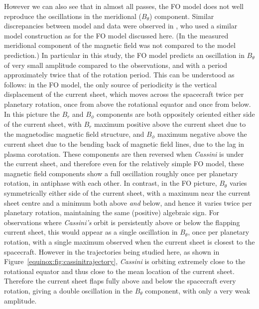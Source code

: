 However we can also see that in almost all passes, the FO model does not well reproduce the oscillations in the meridional ($B_{\theta}$) component. Similar discrepancies between model and data were observed in \citet{achilleos2014}, who used a similar model construction as for the FO model discussed here. (In \citet{arridge2011} the measured meridional component of the magnetic field was not compared to the model prediction.) In particular in this study, the FO model predicts an oscillation in $B_{\theta}$ of very small amplitude compared to the observations, and with a period approximately twice that of the rotation period. This can be understood as follows: in the FO model, the only source of periodicity is the vertical displacement of the current sheet, which moves across the spacecraft twice per planetary rotation, once from above the rotational equator and once from below. In this picture the $B_{r}$ and $B_{\phi}$ components are both oppositely oriented either side of the current sheet, with $B_{r}$ maximum positive above the current sheet due to the magnetodisc magnetic field structure, and $B_{\phi}$ maximum negative above the current sheet due to the bending back of magnetic field lines, due to the lag in plasma corotation. These components are then reversed when \textit{Cassini} is under the current sheet, and therefore even for the relatively simple FO model, these magnetic field components show a full oscillation roughly once per planetary rotation, in antiphase with each other. In contrast, in the FO picture, $B_{\theta}$ varies symmetrically either side of the current sheet, with a maximum near the current sheet centre and a minimum both above \textit{and} below, and hence it varies twice per planetary rotation, maintaining the same (positive) algebraic sign. For observations where \textit{Cassini's} orbit is persistently above or below the flapping current sheet, this would appear as a single oscillation in $B_{\theta}$, once per planetary rotation, with a single maximum observed when the current sheet is closest to the spacecraft. However in the trajectories being studied here, as shown in Figure~\ref{equinox:fig:cassinitrajectory}, \textit{Cassini} is orbiting extremely close to the rotational equator and thus close to the mean location of the current sheet. Therefore the current sheet flaps fully above and below the spacecraft every rotation, giving a double oscillation in the $B_{\theta}$ component, with only a very weak amplitude.

